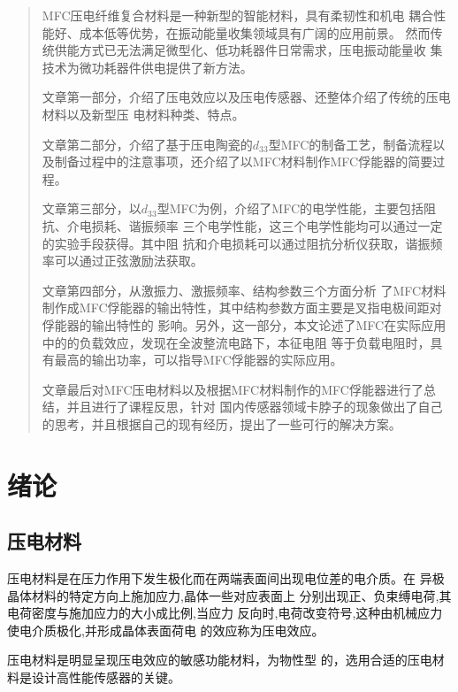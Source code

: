 \documentclass[lang=cn,11pt,a4paper,cite=authoryear]{elegantpaper}
\begin{document}
\begin{abstract}

MFC压电纤维复合材料是一种新型的智能材料，具有柔韧性和机电
耦合性能好、成本低等优势，在振动能量收集领域具有广阔的应用前景。
然而传统供能方式已无法满足微型化、低功耗器件日常需求，压电振动能量收
集技术为微功耗器件供电提供了新方法。

文章第一部分，介绍了压电效应以及压电传感器、还整体介绍了传统的压电材料以及新型压
电材料种类、特点。

文章第二部分，介绍了基于压电陶瓷的$d_{33}$型MFC的制备工艺，制备流程以
及制备过程中的注意事项，还介绍了以MFC材料制作MFC俘能器的简要过程。

文章第三部分，以$d_{33}$型MFC为例，介绍了MFC的电学性能，主要包括阻抗、介电损耗、谐振频率
三个电学性能，这三个电学性能均可以通过一定的实验手段获得。其中阻
抗和介电损耗可以通过阻抗分析仪获取，谐振频率可以通过正弦激励法获取。


文章第四部分，从激振力、激振频率、结构参数三个方面分析
了MFC材料制作成MFC俘能器的输出特性，其中结构参数方面主要是叉指电极间距对俘能器的输出特性的
影响。另外，这一部分，本文论述了MFC在实际应用中的的负载效应，发现在全波整流电路下，本征电阻
等于负载电阻时，具有最高的输出功率，可以指导MFC俘能器的实际应用。

文章最后对MFC压电材料以及根据MFC材料制作的MFC俘能器进行了总结，并且进行了课程反思，针对
国内传感器领域卡脖子的现象做出了自己的思考，并且根据自己的现有经历，提出了一些可行的解决方案。


\end{abstract}
\clearpage

\tableofcontents

\clearpage

\section{绪论}

\subsection{压电材料}

压电材料是在压力作用下发生极化而在两端表面间出现电位差的电介质。在
异极晶体材料的特定方向上施加应力,晶体一些对应表面上
分别出现正、负束缚电荷,其电荷密度与施加应力的大小成比例,当应力
反向时,电荷改变符号,这种由机械应力使电介质极化,并形成晶体表面荷电
的效应称为压电效应。

压电材料是明显呈现压电效应的敏感功能材料，为物性型
的，选用合适的压电材料是设计高性能传感器的关键。
\end{document}
